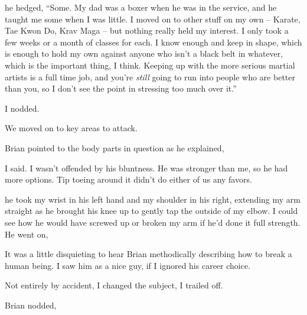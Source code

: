  he hedged, “Some. My dad was a boxer when he was in the service, and he taught me some when I was little. I moved on to other stuff on my own -- Karate, Tae Kwon Do, Krav Maga -- but nothing really held my interest. I only took a few weeks or a month of classes for each. I know enough and keep in shape, which is enough to hold my own against anyone who isn't a black belt in whatever, which is the important thing, I think. Keeping up with the more serious martial artists is a full time job, and you're {\em still} going to run into people who are better than you, so I don't see the point in stressing too much over it.”

I nodded.

We moved on to key areas to attack.

Brian pointed to the body parts in question as he explained, 

 I said. I wasn't offended by his bluntness. He was stronger than me, so he had more options. Tip toeing around it didn't do either of us any favors.

 he took my wrist in his left hand and my shoulder in his right, extending my arm straight as he brought his knee up to gently tap the outside of my elbow. I could see how he would have screwed up or broken my arm if he'd done it full strength. He went on, 

It was a little disquieting to hear Brian methodically describing how to break a human being. I saw him as a nice guy, if I ignored his career choice.

Not entirely by accident, I changed the subject,  I trailed off.

Brian nodded, 


